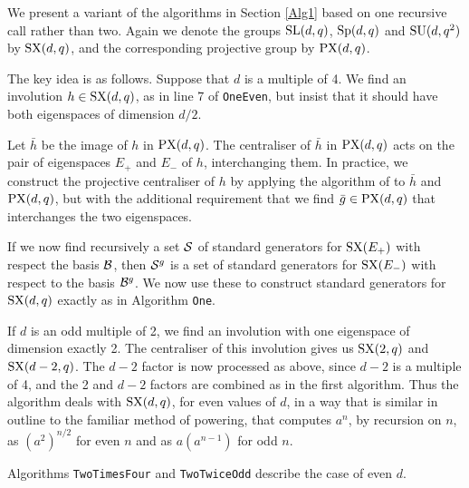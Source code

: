 \documentclass[12pt]{article}
\def\SL{{\rm SL}}
\def\Sp{{\rm Sp}}
\def\SU{{\rm SU}}
\def\SX{{\rm SX}}
\def\PX{{\rm PX}}
\begin{document}
We present a variant of the algorithms in Section \ref{Alg1} based on  
one recursive call rather than two. Again we denote 
the groups $\SL(d,q)$, $\Sp(d,q)$
and $\SU(d,q^2)$ by $\SX(d,q)$, and the corresponding projective group
by $\PX(d,q)$.

The key idea is as follows. Suppose that $d$ is a multiple of 4.  
We find an involution $h \in \SX (d, q)$, as in line 7 of {\tt OneEven},
but insist that it should have both eigenspaces of dimension $d/2$. 

Let $\bar{h}$ be the image of $h$ in $\PX(d,q)$.
The centraliser of $\bar{h}$ in $\PX(d,q)$
acts on the pair of eigenspaces $E_+$ and $E_-$ of $h$, 
interchanging them. In practice, we construct the
projective centraliser of $h$ by applying the algorithm 
of \cite{Bray} to $\bar{h}$ and $\PX(d, q)$, but with the
additional requirement that we find $\bar{g} \in \PX(d, q)$ 
that interchanges the two eigenspaces. 

If we now find recursively a set $\cal S$ of
standard generators for $\SX(E_+)$ with respect the basis $\cal B$,
then ${\cal S}^g$ is a set of standard generators for $\SX(E_-)$ with
respect to the basis ${\cal B}^g$. We now use these 
to construct standard generators for 
$\SX(d,q)$ exactly as in Algorithm {\tt One}.

If $d$ is an odd multiple of 2, we find an involution with one
eigenspace of dimension exactly 2. The centraliser of this
involution gives us $\SX(2,q)$ and $\SX(d-2,q)$. The $d-2$
factor is now processed as above, since $d-2$ is a multiple of 4, and
the 2 and $d-2$ factors are combined as in the first algorithm. Thus
the algorithm deals with $\SX(d,q)$, for even  values of $d$, in a way
that  is similar in outline to the familiar method of powering, that
computes $a^n$, by recursion on $n$, as $(a^2)^{n/2}$ for even $n$ and
as $a(a^{n-1})$ for odd $n$.

Algorithms {\tt TwoTimesFour} and {\tt TwoTwiceOdd} 
describe the case of even $d$. 
\end{document}
